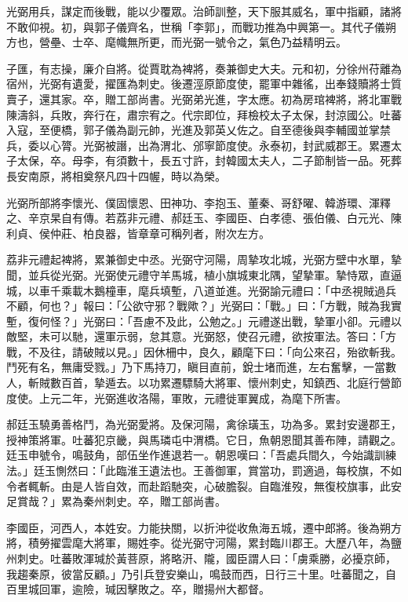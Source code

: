 \begin{pinyinscope}
 光弼用兵，謀定而後戰，能以少覆眾。治師訓整，天下服其威名，軍中指顧，諸將不敢仰視。初，與郭子儀齊名，世稱「李郭」，而戰功推為中興第一。其代子儀朔方也，營壘、士卒、麾幟無所更，而光弼一號令之，氣色乃益精明云。



 子匯，有志操，廉介自將。從賈耽為裨將，奏兼御史大夫。元和初，分徐州苻離為宿州，光弼有遺愛，擢匯為刺史。後遷涇原節度使，罷軍中雜徭，出奉錢贖將士質賣子，還其家。卒，贈工部尚書。光弼弟光進，字太應。初為房琯裨將，將北軍戰陳濤斜，兵敗，奔行在，肅宗宥之。代宗即位，拜檢校太子太保，封涼國公。吐蕃入寇，至便橋，郭子儀為副元帥，光進及郭英乂佐之。自至德後與李輔國並掌禁兵，委以心膂。光弼被譖，出為渭北、邠寧節度使。永泰初，封武威郡王。累遷太子太保，卒。母李，有須數十，長五寸許，封韓國太夫人，二子節制皆一品。死葬長安南原，將相奠祭凡四十四幄，時以為榮。



 光弼所部將李懷光、僕固懷恩、田神功、李抱玉、董秦、哥舒曜、韓游環、渾釋之、辛京杲自有傳。若荔非元禮、郝廷玉、李國臣、白孝德、張伯儀、白元光、陳利貞、侯仲莊、柏良器，皆章章可稱列者，附次左方。



 荔非元禮起裨將，累兼御史中丞。光弼守河陽，周摯攻北城，光弼方壁中水單，摯聞，並兵從光弼。光弼使元禮守羊馬城，植小旗城東北隅，望摯軍。摯恃眾，直逼城，以車千乘載木鵝橦車，麾兵填塹，八道並進。光弼諭元禮曰：「中丞視賊過兵不顧，何也？」報曰：「公欲守邪？戰歟？」光弼曰：「戰。」曰：「方戰，賊為我實塹，復何怪？」光弼曰：「吾慮不及此，公勉之。」元禮遂出戰，摯軍小卻。元禮以敵堅，未可以馳，還軍示弱，怠其意。光弼怒，使召元禮，欲按軍法。答曰：「方戰，不及往，請破賊以見。」因休柵中，良久，顧麾下曰：「向公來召，殆欲斬我。鬥死有名，無庸受戮。」乃下馬持刀，瞋目直前，銳士堵而進，左右奮擊，一當數人，斬賊數百首，摯遁去。以功累遷驃騎大將軍、懷州刺史，知鎮西、北庭行營節度使。上元二年，光弼進收洛陽，軍敗，元禮徙軍翼成，為麾下所害。



 郝廷玉驍勇善格鬥，為光弼愛將。及保河陽，禽徐璜玉，功為多。累封安邊郡王，授神策將軍。吐蕃犯京畿，與馬璘屯中渭橋。它日，魚朝恩聞其善布陣，請觀之。廷玉申號令，鳴鼓角，部伍坐作進退若一。朝恩嘆曰：「吾處兵間久，今始識訓練法。」廷玉惻然曰：「此臨淮王遺法也。王善御軍，賞當功，罰適過，每校旗，不如令者輒斬。由是人皆自效，而赴蹈馳突，心破膽裂。自臨淮歿，無復校旗事，此安足賞哉？」累為秦州刺史。卒，贈工部尚書。



 李國臣，河西人，本姓安。力能抉關，以折沖從收魚海五城，遷中郎將。後為朔方將，積勞擢雲麾大將軍，賜姓李。從光弼守河陽，累封臨川郡王。大歷八年，為鹽州刺史。吐蕃敗渾瑊於黃菩原，將略汧、隴，國臣謂人曰：「虜乘勝，必擾京師，我趨秦原，彼當反顧。」乃引兵登安樂山，鳴鼓而西，日行三十里。吐蕃聞之，自百里城回軍，逾險，瑊因擊敗之。卒，贈揚州大都督。




\end{pinyinscope}
